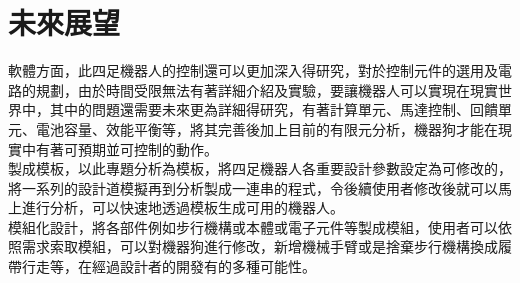 \chapter{未來展望}
\hspace{-1.7em} 軟體方面，此四足機器人的控制還可以更加深入得研究，對於控制元件的選用及電路的規劃，由於時間受限無法有著詳細介紹及實驗，要讓機器人可以實現在現實世界中，其中的問題還需要未來更為詳細得研究，有著計算單元、馬達控制、回饋單元、電池容量、效能平衡等，將其完善後加上目前的有限元分析，機器狗才能在現實中有著可預期並可控制的動作。\\

\hspace{-1.4em} 製成模板，以此專題分析為模板，將四足機器人各重要設計參數設定為可修改的，將一系列的設計道模擬再到分析製成一連串的程式，令後續使用者修改後就可以馬上進行分析，可以快速地透過模板生成可用的機器人。\\

\hspace{-1.4em} 模組化設計，將各部件例如步行機構或本體或電子元件等製成模組，使用者可以依照需求索取模組，可以對機器狗進行修改，新增機械手臂或是捨棄步行機構換成履帶行走等，在經過設計者的開發有的多種可能性。\\

\newpage
